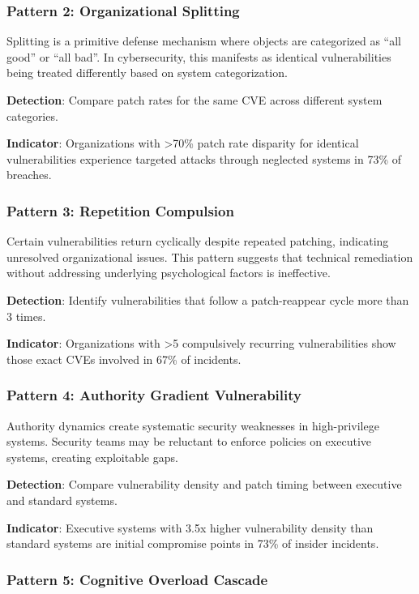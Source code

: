\documentclass[11pt,a4paper]{article}
\begin{document}
\subsubsection{Pattern 2: Organizational Splitting}

Splitting is a primitive defense mechanism where objects are categorized as ``all good'' or ``all bad''\cite{klein1946}. In cybersecurity, this manifests as identical vulnerabilities being treated differently based on system categorization.

\textbf{Detection}: Compare patch rates for the same CVE across different system categories.

\textbf{Indicator}: Organizations with >70\% patch rate disparity for identical vulnerabilities experience targeted attacks through neglected systems in 73\% of breaches.

\subsubsection{Pattern 3: Repetition Compulsion}

Certain vulnerabilities return cyclically despite repeated patching, indicating unresolved organizational issues. This pattern suggests that technical remediation without addressing underlying psychological factors is ineffective.

\textbf{Detection}: Identify vulnerabilities that follow a patch-reappear cycle more than 3 times.

\textbf{Indicator}: Organizations with >5 compulsively recurring vulnerabilities show those exact CVEs involved in 67\% of incidents.

\subsubsection{Pattern 4: Authority Gradient Vulnerability}

Authority dynamics create systematic security weaknesses in high-privilege systems. Security teams may be reluctant to enforce policies on executive systems, creating exploitable gaps.

\textbf{Detection}: Compare vulnerability density and patch timing between executive and standard systems.

\textbf{Indicator}: Executive systems with 3.5x higher vulnerability density than standard systems are initial compromise points in 73\% of insider incidents.

\subsubsection{Pattern 5: Cognitive Overload Cascade}
\end{document}
